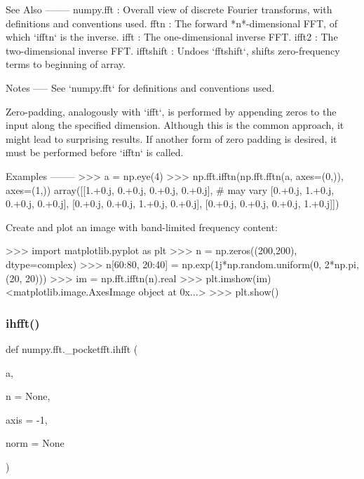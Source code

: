 \begin{DoxyVerb}
See Also
--------
numpy.fft : Overall view of discrete Fourier transforms, with definitions
     and conventions used.
fftn : The forward *n*-dimensional FFT, of which `ifftn` is the inverse.
ifft : The one-dimensional inverse FFT.
ifft2 : The two-dimensional inverse FFT.
ifftshift : Undoes `fftshift`, shifts zero-frequency terms to beginning
    of array.

Notes
-----
See `numpy.fft` for definitions and conventions used.

Zero-padding, analogously with `ifft`, is performed by appending zeros to
the input along the specified dimension.  Although this is the common
approach, it might lead to surprising results.  If another form of zero
padding is desired, it must be performed before `ifftn` is called.

Examples
--------
>>> a = np.eye(4)
>>> np.fft.ifftn(np.fft.fftn(a, axes=(0,)), axes=(1,))
array([[1.+0.j,  0.+0.j,  0.+0.j,  0.+0.j], # may vary
       [0.+0.j,  1.+0.j,  0.+0.j,  0.+0.j],
       [0.+0.j,  0.+0.j,  1.+0.j,  0.+0.j],
       [0.+0.j,  0.+0.j,  0.+0.j,  1.+0.j]])


Create and plot an image with band-limited frequency content:

>>> import matplotlib.pyplot as plt
>>> n = np.zeros((200,200), dtype=complex)
>>> n[60:80, 20:40] = np.exp(1j*np.random.uniform(0, 2*np.pi, (20, 20)))
>>> im = np.fft.ifftn(n).real
>>> plt.imshow(im)
<matplotlib.image.AxesImage object at 0x...>
>>> plt.show()\end{DoxyVerb}
 \mbox{\label{namespacenumpy_1_1fft_1_1__pocketfft_aaf5afee21f4173f2f52ab5a30e5e25b0}} 
\subsubsection{\texorpdfstring{ihfft()}{ihfft()}}
{\footnotesize\ttfamily def numpy.\+fft.\+\_\+pocketfft.\+ihfft (\begin{DoxyParamCaption}\item[{}]{a,  }\item[{}]{n = {\ttfamily None},  }\item[{}]{axis = {\ttfamily -\/1},  }\item[{}]{norm = {\ttfamily None} }\end{DoxyParamCaption})}

